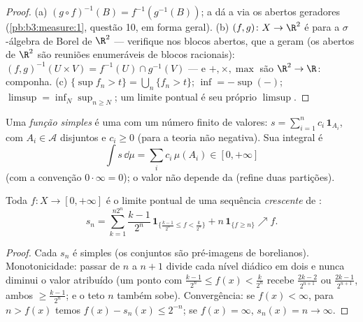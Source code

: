 \begin{proof}
(a) $(g\circ f)^{-1}(B) = f^{-1}(g^{-1}(B))$; a  dá a  via os abertos geradores
(\cref{pb:b3:measure:1}, questão 10, em forma geral).
(b) $(f, g) \colon X \to \R^2$ é  para a $\sigma$-álgebra de Borel de $\R^2$
--- verifique nos blocos abertos, que a geram (os abertos de $\R^2$
são reuniões enumeráveis de blocos racionais): $(f,g)^{-1}(U\times V) = f^{-1}(U)\cap g^{-1}(V)$ --- e $+, \times, \max$ são
 $\R^2 \to \R$: componha.
(c) $\{\sup f_n > t\} = \bigcup_n\{f_n > t\}$; $\inf = -\sup(-)$; $\limsup = \inf_N\sup_{n \geq N}$; um limite pontual é seu próprio $\limsup$.
\end{proof}

\begin{definition}\label{def:b3:lebesgue:simple}
Uma \emph{função simples} é uma 
com um número finito de valores: $s = \sum_{i=1}^n
c_i\,\mathbf 1_{A_i}$, com $A_i \in \mathcal A$ disjuntos e $c_i \geq
0$ (para
a teoria não negativa). Sua integral é
\[
\int s\,\dd\mu = \sum_i c_i\,\mu(A_i) \in [0, +\infty]
\]
(com a convenção $0\cdot\infty = 0$); o valor não depende da  (refine
duas partições).
\end{definition}

\begin{theorem}
\label{thm:b3:lebesgue:approximation}
Toda  $f \colon X \to [0, +\infty]$ é o limite pontual de uma sequência
\emph{crescente} de :
\[
s_n = \sum_{k=1}^{n2^n} \frac{k-1}{2^n}\,
\mathbf 1_{\{\frac{k-1}{2^n} \leq f < \frac k{2^n}\}}
+ n\,\mathbf 1_{\{f \geq n\}} \nearrow f .
\]
\end{theorem}

\begin{proof}
Cada $s_n$ é simples (os conjuntos são pré-imagens de borelianos).
Monotonicidade: passar de $n$ a $n+1$ divide cada nível diádico em
dois e nunca diminui o valor atribuído (um ponto com $\frac{k-1}{2^n} \leq f(x) < \frac k{2^n}$ recebe $\frac{2k-2}{2^{n+1}}$
ou $\frac{2k-1}{2^{n+1}}$, ambos $\geq
\frac{k-1}{2^n}$; e o teto $n$ também sobe). Convergência: se
$f(x) < \infty$, para $n > f(x)$ temos $f(x) - s_n(x) \leq
2^{-n}$; se $f(x) = \infty$, $s_n(x) = n \to \infty$.
\end{proof}

